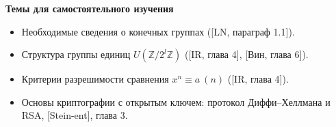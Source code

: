 \documentclass[a4paper, 11pt]{article}
\begin{document}

    

    

\noindent\textbf{Темы для самостоятельного изучения}
\begin{itemize}[topsep=0pt]
    \item Необходимые сведения о конечных группах ([LN, параграф 1.1]).
    \item Структура группы единиц $U(\mathbb{Z}/2^l\mathbb{Z})$ ([IR, глава 4], [Вин, глава 6]).
    \item Критерии разрешимости сравнения $x^n\equiv a\ (n)$ ([IR, глава 4]).
    \item Основы криптографии с открытым ключем: протокол Диффи--Хеллмана и RSA, [Stein-ent], глава 3.
\end{itemize}
\end{document}
